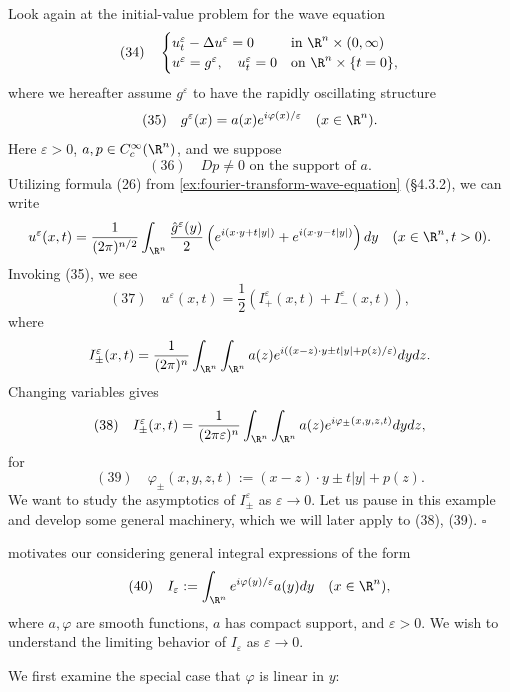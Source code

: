 \begin{example}
\label{ex:stationary-phase-wave-equation}
Look again at the initial-value problem for the wave equation
$$(34) \quad \begin{cases} u_t^\varepsilon - \Delta u^\varepsilon = 0 & \text{in } \R^n \times (0, \infty) \\ u^\varepsilon = g^\varepsilon, \quad u_t^\varepsilon = 0 & \text{on } \R^n \times \{t = 0\}, \end{cases}$$
where we hereafter assume $g^\varepsilon$ to have the rapidly oscillating structure
$$(35) \quad g^\varepsilon(x) = a(x) e^{i\varphi(x)/\varepsilon} \quad (x \in \R^n).$$
Here $\varepsilon > 0$, $a, p \in C_c^\infty(\R^n)$, and we suppose
$$(36) \quad Dp \neq 0 \text{ on the support of } a.$$
Utilizing formula (26) from \cref{ex:fourier-transform-wave-equation} (\S4.3.2), we can write
$$u^\varepsilon(x,t) = \frac{1}{(2\pi)^{n/2}} \int_{\R^n} \frac{\hat{g}^\varepsilon(y)}{2}\left(e^{i(x \cdot y + t|y|)} + e^{i(x \cdot y - t|y|)}\right) dy \quad (x \in \R^n, t > 0).$$
Invoking (35), we see
$$(37) \quad u^\varepsilon(x,t) = \frac{1}{2}(I_+^\varepsilon(x,t) + I_-^\varepsilon(x,t)),$$
where
$$I_\pm^\varepsilon(x,t) = \frac{1}{(2\pi)^n} \int_{\R^n} \int_{\R^n} a(z)e^{i((x-z) \cdot y \pm t|y| + p(z)/\varepsilon)} dy dz.$$
Changing variables gives
$$(38) \quad I_\pm^\varepsilon(x,t) = \frac{1}{(2\pi\varepsilon)^n} \int_{\R^n} \int_{\R^n} a(z)e^{i\varphi_\pm(x,y,z,t)} dy dz,$$
for
$$(39) \quad \varphi_\pm(x,y,z,t) := (x-z) \cdot y \pm t|y| + p(z).$$
We want to study the asymptotics of $I_\pm^\varepsilon$ as $\varepsilon \to 0$. Let us pause in this example and develop some general machinery, which we will later apply to (38), (39). $\square$
\end{example}

 motivates our considering general integral expressions of the form
$$(40) \quad I_\varepsilon := \int_{\R^n} e^{i\varphi(y)/\varepsilon} a(y) dy \quad (x \in \R^n),$$
where $a, \varphi$ are smooth functions, $a$ has compact support, and $\varepsilon > 0$. We wish to understand the limiting behavior of $I_\varepsilon$ as $\varepsilon \to 0$.

We first examine the special case that $\varphi$ is linear in $y$:

